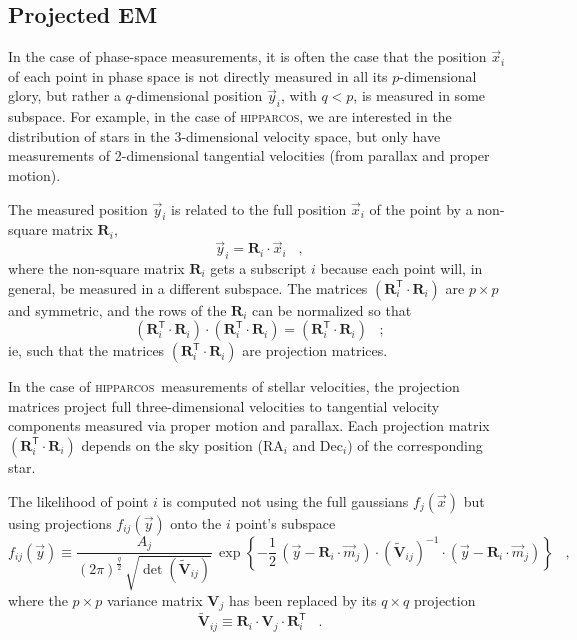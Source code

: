 \documentclass{article}
\newcommand{\hipparcos}{\textsc{hipparcos}}
\begin{document}
\subsection{Projected EM}

In the case of phase-space measurements, it is often the case that the
position $\vec{x}_i$ of each point in phase space is not directly
measured in all its $p$-dimensional glory, but rather a
$q$-dimensional position $\vec{y}_i$, with $q<p$, is measured in some
subspace.  For example, in the case of \hipparcos, we are interested
in the distribution of stars in the 3-dimensional velocity space, but
only have measurements of 2-dimensional tangential velocities (from
parallax and proper motion).

The measured position $\vec{y}_i$ is related to the full position
$\vec{x}_i$ of the point by a non-square matrix $\mathbf{R}_i$,
\begin{equation}
\vec{y}_i= \mathbf{R}_i\cdot\vec{x}_i \;\;\; ,
\end{equation}
where the non-square matrix $\mathbf{R}_i$ gets a subscript $i$
because each point will, in general, be measured in a different
subspace.  The matrices $(\mathbf{R}_i^\mathsf{T}\cdot\mathbf{R}_i)$
are $p\times p$ and symmetric, and the rows of the $\mathbf{R}_i$ can
be normalized so that
\begin{equation}
(\mathbf{R}_i^\mathsf{T}\cdot\mathbf{R}_i)\cdot
(\mathbf{R}_i^\mathsf{T}\cdot\mathbf{R}_i)=
(\mathbf{R}_i^\mathsf{T}\cdot\mathbf{R}_i) \;\;\; ;
\end{equation}
ie, such that the matrices
$(\mathbf{R}_i^\mathsf{T}\cdot\mathbf{R}_i)$ are projection matrices.

In the case of \hipparcos\ measurements of stellar velocities, the
projection matrices project full three-dimensional velocities to
tangential velocity components measured via proper motion and
parallax.  Each projection matrix
$(\mathbf{R}_i^\mathsf{T}\cdot\mathbf{R}_i)$ depends on the sky
position (RA$_i$ and Dec$_i$) of the corresponding star.

The likelihood of point $i$ is computed not using the full gaussians
$f_j(\vec{x})$ but using projections $f_{ij}(\vec{y})$ onto the $i$
point's subspace
\begin{equation}
f_{ij}(\vec{y})\equiv
  \frac{A_j}{(2\pi)^\frac{q}{2}\,\sqrt{\det(\mathbf{\tilde{V}}_{ij})}}\,
  \exp\left\{-\frac{1}{2}\,
  (\vec{y}-\mathbf{R}_i\cdot\vec{m}_j)
  \cdot(\mathbf{\tilde{V}}_{ij})^{-1}\cdot
  (\vec{y}-\mathbf{R}_i\cdot\vec{m}_j)\right\} \;\;\; ,
\end{equation}
where the $p\times p$ variance matrix $\mathbf{V}_j$ has been replaced
by its $q\times q$ projection
\begin{equation}
\mathbf{\tilde{V}}_{ij}\equiv
  \mathbf{R}_i\cdot\mathbf{V}_j\cdot\mathbf{R}_i^\mathsf{T} \;\;\; .
\end{equation}
\end{document}

